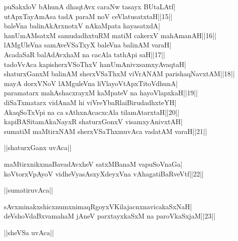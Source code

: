 \documentclass{article}
\begin{document}
puSakxloV bAhunA dhaqtAvx caraNw tasayx BUtaLAtf|\\
utApxTayAmAsa tadA paraM noV ceVlatusatxtaH||15||\\
baleVna balinAkArxnotxV nAkaMpata hayasatxdA|\\
hanUmAMsatxM samudadhxtuRM matiM cakerxV mahAmanAH||16||\\
lAMgUleVna samAveVSaTxyX baleVna balinAM varaH|\\
AcadaSaR balAdAvxhaM na cacAla tathApi saH||17||\\
tadoVvAca kapisherxVSoThxV hanUmAnivxsamxyAvaqtaH|\\
shaturxGanxM balinAM sherxVSaThxM viVrANAM parishaqNavxtAM||18||\\
mayA dorxVNoV lAMguleVna liVlayoVtApxTitoVdhunA|\\
paramatarx mahAshacxrayxM kaMpateV na hayoVlapxkaH||19||\\
diSaTxmatarx vidAnaM hi viVreYbaRlaiBirudadhxteYH|\\
AkaqSoTxVpi na ca sAthxnAcacxcAla tilamAtarxtaH||20||\\
kapiBASitamAkaNayxR shaturxGonxV visamxyAnivxtAH|\\
sumatiM maMtirxNAM sherxVSaThxmuvAca vadatAM varaH||21||\\

\begin{center}
||shaturxGanx uvAca||
\end{center}

maMtirxnikxmaBavadAvxheV satxMBanaM vapuSoVnaGa|\\
koVtorxVpAyoV vidheVyasAsxyXdeyxVna vAhagatiBaRveVtf||22||\\

\begin{center}
||sumatiruvAca||
\end{center}

sAvxminakxshicxnumxnimaqRgoyxVKilajacnxnavicakaSxNaH|\\
deVshoVdaBxvamahaM jAneV parxtayxkaSxM na paroVkaSxjaM||23||\\

\begin{center}
||sheVSa uvAca||
\end{center}
\end{document}
